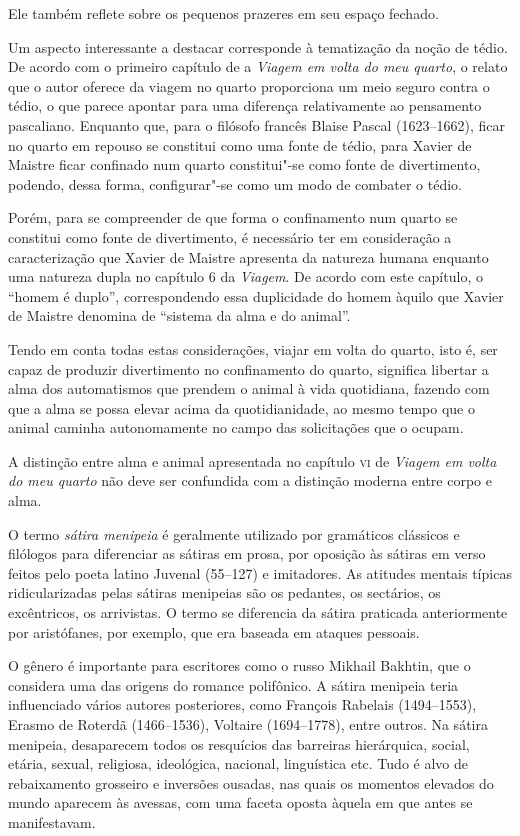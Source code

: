 \documentclass[12pt]{extarticle}
\begin{document}
Ele também reflete sobre os pequenos prazeres em seu espaço fechado.

Um aspecto interessante a destacar corresponde à tematização da noção de tédio. De acordo com o primeiro capítulo de a \textit{Viagem em volta do meu quarto}, o relato que o autor oferece da viagem no quarto proporciona um meio seguro contra o tédio, o que parece apontar para uma diferença relativamente ao pensamento pascaliano. Enquanto que, para o filósofo francês Blaise Pascal (1623--1662), ficar no quarto em repouso se constitui como uma fonte de tédio, para Xavier de Maistre ficar confinado num quarto constitui"-se como fonte de divertimento, 
podendo, dessa forma, configurar"-se como um modo de combater o tédio. 

Porém, para se compreender de que forma o confinamento num quarto se constitui como fonte de divertimento, é necessário ter em consideração a caracterização que Xavier de Maistre apresenta da natureza humana enquanto uma natureza dupla no capítulo 6 da \textit{Viagem}. De acordo com este capítulo, o ``homem é duplo'', correspondendo essa duplicidade do homem àquilo que Xavier de Maistre denomina de ``sistema da alma e do animal''. 

Tendo em conta todas estas considerações, viajar em volta do quarto, isto é, ser capaz de produzir divertimento no confinamento do quarto, significa libertar a alma dos
automatismos que prendem o animal à vida quotidiana, fazendo com que a alma se
possa elevar acima da quotidianidade, ao mesmo tempo que o animal caminha autonomamente no campo das solicitações que o ocupam.

A distinção entre alma e animal apresentada no capítulo \textsc{vi} de \textit{Viagem em volta do meu quarto} 
não deve ser confundida com a distinção moderna entre corpo e alma. 

O termo \textit{sátira menipeia} é geralmente utilizado por gramáticos clássicos e filólogos 
para diferenciar as sátiras em prosa, por oposição às sátiras em verso feitos pelo poeta 
latino Juvenal (55--127) e imitadores. As atitudes mentais típicas ridicularizadas pelas sátiras menipeias são os pedantes, os sectários, os excêntricos, os arrivistas. O termo se diferencia da sátira praticada anteriormente por aristófanes, por exemplo, que era baseada em ataques pessoais. 

O gênero é importante para escritores como o russo Mikhail Bakhtin, que o considera uma das origens do romance polifônico.  A sátira menipeia teria influenciado vários autores posteriores, como 
François Rabelais (1494--1553), 
Erasmo de Roterdã (1466--1536), 
Voltaire (1694--1778), entre outros.
Na sátira menipeia, desaparecem todos os resquícios das barreiras hierárquica, social, etária, sexual, religiosa, ideológica, nacional, linguística etc. Tudo é alvo de rebaixamento grosseiro e inversões ousadas, nas quais os momentos elevados do mundo aparecem às avessas, com uma faceta oposta àquela em que antes se manifestavam.
\end{document}
